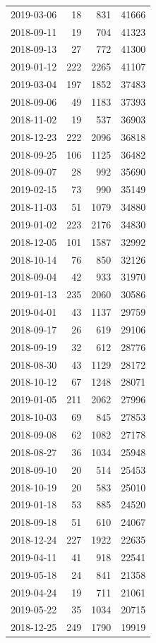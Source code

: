 \begin{tabular}{lrrr}
2019-03-06 & 18 & 831 & 41666 \\
2018-09-11 & 19 & 704 & 41323 \\
2018-09-13 & 27 & 772 & 41300 \\
2019-01-12 & 222 & 2265 & 41107 \\
2019-03-04 & 197 & 1852 & 37483 \\
2018-09-06 & 49 & 1183 & 37393 \\
2018-11-02 & 19 & 537 & 36903 \\
2018-12-23 & 222 & 2096 & 36818 \\
2018-09-25 & 106 & 1125 & 36482 \\
2018-09-07 & 28 & 992 & 35690 \\
2019-02-15 & 73 & 990 & 35149 \\
2018-11-03 & 51 & 1079 & 34880 \\
2019-01-02 & 223 & 2176 & 34830 \\
2018-12-05 & 101 & 1587 & 32992 \\
2018-10-14 & 76 & 850 & 32126 \\
2018-09-04 & 42 & 933 & 31970 \\
2019-01-13 & 235 & 2060 & 30586 \\
2019-04-01 & 43 & 1137 & 29759 \\
2018-09-17 & 26 & 619 & 29106 \\
2018-09-19 & 32 & 612 & 28776 \\
2018-08-30 & 43 & 1129 & 28172 \\
2018-10-12 & 67 & 1248 & 28071 \\
2019-01-05 & 211 & 2062 & 27996 \\
2018-10-03 & 69 & 845 & 27853 \\
2018-09-08 & 62 & 1082 & 27178 \\
2018-08-27 & 36 & 1034 & 25948 \\
2018-09-10 & 20 & 514 & 25453 \\
2018-10-19 & 20 & 583 & 25010 \\
2019-01-18 & 53 & 885 & 24520 \\
2018-09-18 & 51 & 610 & 24067 \\
2018-12-24 & 227 & 1922 & 22635 \\
2019-04-11 & 41 & 918 & 22541 \\
2019-05-18 & 24 & 841 & 21358 \\
2019-04-24 & 19 & 711 & 21061 \\
2019-05-22 & 35 & 1034 & 20715 \\
2018-12-25 & 249 & 1790 & 19919 \\

\end{tabular}
